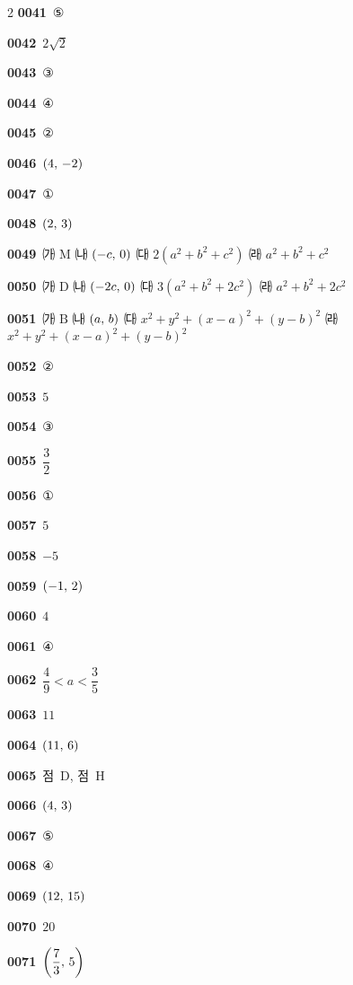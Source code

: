 \documentclass[10pt,a4paper]{article}
\newcommand{\pt}[1]{\mathrm{#1}}
\begin{document}
\begin{multicols}{2}
\noindent\textbf{0041}\ ⑤\par
\noindent\textbf{0042}\ $2\sqrt{2}$\par
\noindent\textbf{0043}\ ③\par
\noindent\textbf{0044}\ ④\par
\noindent\textbf{0045}\ ②\par
\noindent\textbf{0046}\ $(4,\mkern3mu -2)$\par
\noindent\textbf{0047}\ ①\par
\noindent\textbf{0048}\ $(2,\mkern3mu 3)$\par
\noindent\textbf{0049}\ ㈎ $\pt{M}$ \quad ㈏ $(-c,\mkern3mu 0)$ \quad ㈐ $2(a^2+b^2+c^2)$ \quad ㈑ $a^2+b^2+c^2$\par
\noindent\textbf{0050}\ ㈎ $\pt{D}$ \quad ㈏ $(-2c,\mkern3mu 0)$ \quad ㈐ $3(a^2+b^2+2c^2)$ \quad ㈑ $a^2+b^2+2c^2$\par
\noindent\textbf{0051}\ ㈎ $\pt{B}$ \quad ㈏ $(a,\mkern3mu b)$ \quad ㈐ $x^2+y^2+(x-a)^2+(y-b)^2$ \quad ㈑ $x^2+y^2+(x-a)^2+(y-b)^2$\par
\noindent\textbf{0052}\ ②\par
\noindent\textbf{0053}\ $5$\par
\noindent\textbf{0054}\ ③\par
\noindent\textbf{0055}\ $\dfrac{3}{2}$\par
\noindent\textbf{0056}\ ①\par
\noindent\textbf{0057}\ $5$\par
\noindent\textbf{0058}\ $-5$\par
\noindent\textbf{0059}\ $(-1,\mkern3mu 2)$\par
\noindent\textbf{0060}\ $4$\par
\noindent\textbf{0061}\ ④\par
\noindent\textbf{0062}\ $\dfrac{4}{9}<a<\dfrac{3}{5}$\par
\noindent\textbf{0063}\ $11$\par
\noindent\textbf{0064}\ $(11,\mkern3mu 6)$\par
\noindent\textbf{0065}\ 점~$\pt{D}$, 점~$\pt{H}$\par
\noindent\textbf{0066}\ $(4,\mkern3mu 3)$\par
\noindent\textbf{0067}\ ⑤\par
\noindent\textbf{0068}\ ④\par
\noindent\textbf{0069}\ $(12,\mkern3mu 15)$\par
\noindent\textbf{0070}\ $20$\par
\noindent\textbf{0071}\ $\left(\dfrac{7}{3},\mkern3mu 5\right)$\par

\end{multicols}
\end{document}
